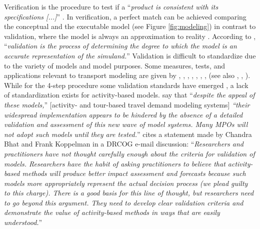 Verification is the procedure to test if a ``\emph{product is consistent with its specifications [...]}'' \citet[][p.330]{Petty_SokolowskiBanks_2010}. In verification, a perfect match can be achieved comparing the conceptual and the executable model (see Figure \ref{fig:modeling}) in contrast to validation, where the model is always an approximation to reality \citep[][p.145]{Kleijnen_EJOR_1995}. According to \citet[][p.331]{Petty_SokolowskiBanks_2010}, ``\emph{validation is the process of determining the degree to which the model is an accurate representation of the simuland.}'' Validation is difficult to standardize due to the variety of models and model purposes. Some measures, tests, and applications relevant to transport modeling are given by \citet[][Table 2]{MilamChao_TRBATPM_2001}, \citet[][]{Lima_TechRep_LMPO_2006}, \citet[][p.155]{KurthEtAl_TRBTDF_2006}, \citet[][p.157]{PendyalaBhat_TRBTDF_2006}, \citet[][p.8]{WegmannEverett_TechRep_CTRUT_2008}, \citet[][]{MilamChao_TRBATPM_2001, RoordaEtAl_TransResA_2008, HawasHameed_TPT_2009, SadekEtAl_TRR_2003, GouliasKitamura_TRR_1992}, \citet[][p.25]{CambridgeSystematics_manual_2008}, \citet[][p.145]{Kleijnen_EJOR_1995} (see also \citet[][]{David_EACSSS_2009}, \citet[][p.56]{SbaytiRoden_ResRep_AASHTO_2010}, \citet[][]{SchifferRossi_TRB_2009}). While for the 4-step procedure some validation standards have emerged \citep[e.g.,][]{BartonAschmanCambridgeSystematics_manual_1997}, a lack of standardization exists for activity-based models. \citet[][]{PendyalaBhat_TRBTDF_2006} say that ``\emph{despite the appeal of these models,}'' [activity- and tour-based travel demand modeling systems] \emph{``their widespread implementation appears to be hindered by the absence of a detailed validation and assessment of this new wave of model systems. Many MPOs will not adopt such models until they are tested.}'' \citet[][]{KurthEtAl_TRBTDF_2006} cites a statement made by Chandra Bhat and Frank Koppelman in a DRCOG e-mail discussion: ``\emph{Researchers and practitioners have not thought carefully enough about the criteria for validation of models. Researchers have the habit of asking practitioners to believe that activity- based methods will produce better impact assessment and forecasts because such models more appropriately represent the actual decision process (we plead guilty to this charge). There is a good basis for this line of thought, but researchers need to go beyond this argument. They need to develop clear validation criteria and demonstrate the value of activity-based methods in ways that are easily understood.}''

